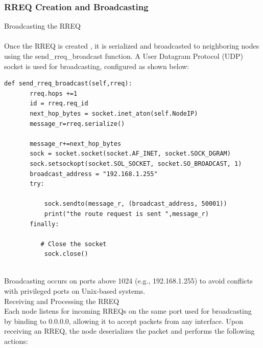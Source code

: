 \documentclass[]{nsm-thesis}
\begin{document}
\subsubsection{RREQ Creation and Broadcasting}
{\large Broadcasting the RREQ }\\ \\
Once the RREQ is created , it is serialized and  broadcasted to neighboring nodes using the send\_rreq\_broadcast function. A User Datagram Protocol (UDP) socket is used for broadcasting, configured as shown below:
\lstset{
  basicstyle=\ttfamily\small,  %
  numbers=left,               %
  numberstyle=\tiny,          %
  stepnumber=1,               %
  numbersep=5pt,              %
  showstringspaces=false,     %
  frame=single,               %
  breaklines=true,            %
  captionpos=b,               %
  language=Python             %
}
\begin{lstlisting}[caption={RREQ Broadcasting}, label={lst:example}]
def send_rreq_broadcast(self,rreq):
       rreq.hops +=1
       id = rreq.req_id
       next_hop_bytes = socket.inet_aton(self.NodeIP)
       message_r=rreq.serialize()
          
       message_r+=next_hop_bytes
       sock = socket.socket(socket.AF_INET, socket.SOCK_DGRAM)
       sock.setsockopt(socket.SOL_SOCKET, socket.SO_BROADCAST, 1)
       broadcast_address = "192.168.1.255"
       try:
       
           sock.sendto(message_r, (broadcast_address, 50001))
           print("the route request is sent ",message_r)
       finally:
       
          # Close the socket
           sock.close()


\end{lstlisting}

Broadcasting occurs on ports above 1024 (e.g., 192.168.1.255) to avoid conflicts with privileged ports on Unix-based systems.\\

{\large Receiving and Processing the RREQ }\\ 

Each node listens for incoming RREQs on the same port used for broadcasting by binding to 0.0.0.0, allowing it to accept packets from any interface. Upon receiving an RREQ, the node deserializes the packet and performs the following actions:
\end{document}
